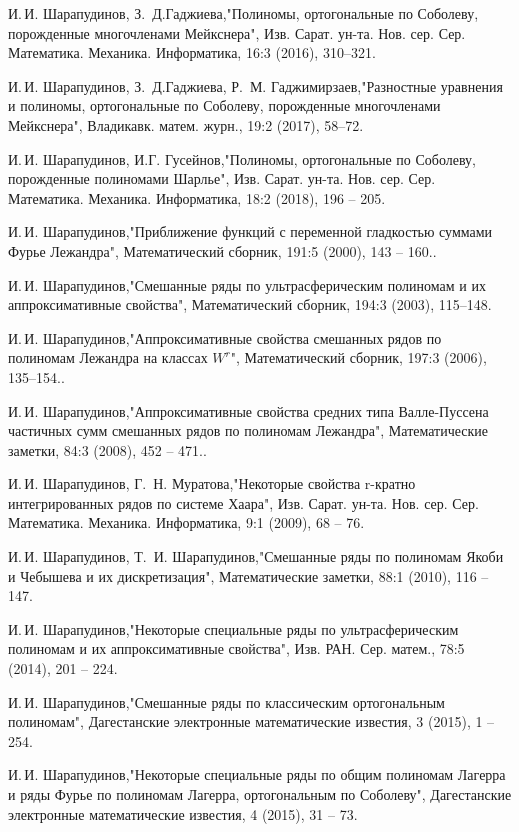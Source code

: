 \begin{thebibliography}{99}
И.\,И. Шарапудинов, З.\, Д.Гаджиева,"Полиномы, ортогональные по Соболеву, порожденные многочленами Мейкснера", Изв. Сарат. ун-та. Нов. сер. Сер. Математика. Механика. Информатика, 16:3 (2016), 310--321.


И.\,И. Шарапудинов, З.\, Д.Гаджиева, Р.\, М. Гаджимирзаев,"Разностные уравнения и полиномы, ортогональные по Соболеву, порожденные многочленами Мейкснера", Владикавк. матем. журн., 19:2 (2017), 58--72.


И.\,И. Шарапудинов, И.Г. Гусейнов,"Полиномы, ортогональные по Соболеву, порожденные полиномами Шарлье", Изв. Сарат. ун-та. Нов. сер. Сер. Математика. Механика. Информатика, 18:2 (2018), 196 -- 205.


И.\,И. Шарапудинов,"Приближение функций с переменной гладкостью суммами Фурье Лежандра", Математический сборник, 191:5 (2000), 143 -- 160..


И.\,И. Шарапудинов,"Смешанные ряды по ультрасферическим полиномам и их аппроксимативные свойства", Математический сборник, 194:3 (2003), 115--148.


И.\,И. Шарапудинов,"Аппроксимативные свойства смешанных рядов по полиномам Лежандра на классах $W^r$", Математический сборник, 197:3 (2006), 135–154..


И.\,И. Шарапудинов,"Аппроксимативные свойства средних типа Валле-Пуссена частичных сумм смешанных рядов по полиномам Лежандра", Математические заметки, 84:3 (2008), 452 -- 471..


И.\,И. Шарапудинов,  Г.\, Н. Муратова,"Некоторые свойства r-кратно интегрированных рядов по системе Хаара", Изв. Сарат. ун-та. Нов. сер. Сер. Математика. Механика. Информатика, 9:1 (2009), 68 -- 76.


И.\,И. Шарапудинов, Т.\, И. Шарапудинов,"Смешанные ряды по полиномам Якоби и Чебышева и их дискретизация", Математические заметки, 88:1 (2010), 116 -- 147.


И.\,И. Шарапудинов,"Некоторые специальные ряды по ультрасферическим полиномам и их аппроксимативные свойства", Изв. РАН. Сер. матем., 78:5 (2014), 201 -- 224.


И.\,И. Шарапудинов,"Смешанные ряды по классическим ортогональным полиномам", Дагестанские электронные математические известия, 3 (2015), 1 -- 254.


И.\,И. Шарапудинов,"Некоторые специальные ряды по общим полиномам Лагерра и ряды Фурье по полиномам Лагерра, ортогональным по Соболеву", Дагестанские электронные математические известия, 4 (2015), 31 -- 73.



\end{thebibliography}
